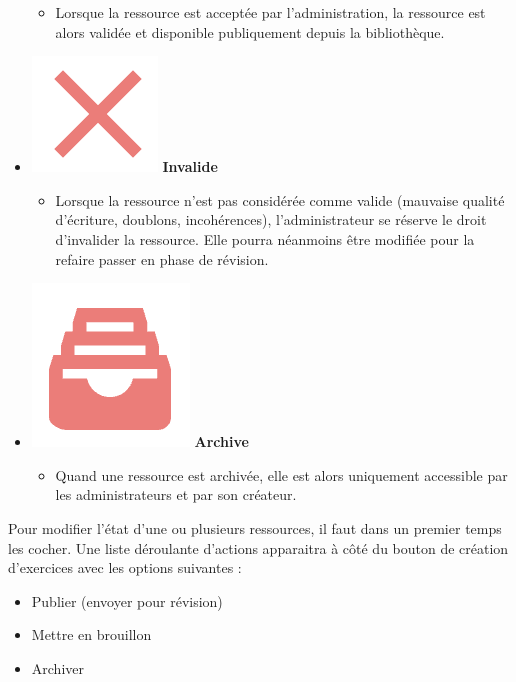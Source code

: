 \begin{itemize}
    \begin{itemize}
        \item Lorsque la ressource est acceptée par l'administration, la ressource est alors validée et disponible publiquement depuis la bibliothèque.
    \end{itemize} 
    \item \includegraphics[valign=b,height=1.4\fontcharht\font`X]{images/client/not-validated.png} \textbf{Invalide}
    \begin{itemize}
        \item Lorsque la ressource n'est pas considérée comme valide (mauvaise qualité d'écriture, doublons, incohérences), l'administrateur se réserve le droit d'invalider la ressource. Elle pourra néanmoins être modifiée pour la refaire passer en phase de révision.
    \end{itemize}
    \item \includegraphics[valign=b,height=1.4\fontcharht\font`X]{images/client/archive.png} \textbf{Archive}
    \begin{itemize}
        \item Quand une ressource est archivée, elle est alors uniquement accessible par les administrateurs et par son créateur.
    \end{itemize}
\end{itemize}


Pour modifier l'état d'une ou plusieurs ressources, il faut dans un premier temps les cocher. Une liste déroulante d'actions apparaitra à côté du bouton de création d'exercices avec les options suivantes :

\begin{itemize}
    \item Publier (envoyer pour révision)
    \item Mettre en brouillon
    \item Archiver
\end{itemize}


